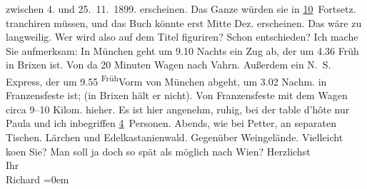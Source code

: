 \begin{ledgroupsized}[t]{13cm}
{{{                  zwischen 4. und 25. 11. 1899.}}}\label{K_L00973_1h} erscheinen. Das
               Ganze würden sie in \uline{10} Fortsetz. tranchiren müssen,
               und das Buch könnte erst Mitte Dez. erscheinen. Das wäre zu langweilig. Wer wird also
               auf dem Titel figuriren? Schon entschieden? Ich {\pb}mache Sie aufmerksam: In München geht um 9.10 Nachts ein Zug
               ab, der um 4.36 Früh in Brixen ist. Von da 20
               Minuten Wagen nach Vahrn. Außerdem ein N. S. Express, der um
                  9.55{ }\substVorne{}\textsuperscript{Früh}\substDazwischen{}Vorm\substHinten{} von München abgeht, um 3.02
                  Nachm. in Franzensfeste ist;  (in Brixen hält
               er nicht). Von Franzensfeste mit dem Wagen circa
               9–10 Kilom. hieher. Es ist hier angenehm, ruhig, bei der table d’hôte nur Paula und ich inbegriffen \uline{4} Personen. Abends, wie bei Petter, an
               separaten Tischen. Lärchen und Edelkastanienwald. Gegenüber Weingelände. Vielleicht
                  ko{\geminationm}en Sie? Man soll ja doch so spät als möglich nach
                  Wien?\pend
           \pstart
           Herzlichst{\\[\baselineskip]}Ihr{\\[\baselineskip]}\spacefill\mbox{Richard}\pend
           \leftskip=0em{}          \endnumbering{}\end{ledgroupsized}  \newcommand{\dateiname}{L00973}\newcommand{\titel}{Richard Beer-Hofmann an Arthur Schnitzler, 12. 9. 1899}\newcommand{\editorInnen}{Martin Anton Müller und Gerd-Hermann Susen}
            \footnotesize
\begin{ledgroupsized}[t]{11.5cm}
\end{ledgroupsized}
         
      